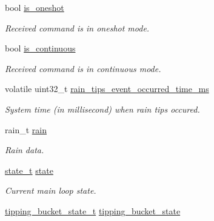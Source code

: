\begin{DoxyCompactItemize}
\mbox{\label{i2c-rain_8h_a6090a983e62d9556906716dd85f78d9d}} 
bool \hyperlink{i2c-rain_8h_a6090a983e62d9556906716dd85f78d9d}{is\+\_\+oneshot}
\begin{DoxyCompactList}\small\item\em Received command is in oneshot mode. \end{DoxyCompactList}\item 
\mbox{\label{i2c-rain_8h_a75ef189b6b17aa09010c574ed6b01fc3}} 
bool \hyperlink{i2c-rain_8h_a75ef189b6b17aa09010c574ed6b01fc3}{is\+\_\+continuous}
\begin{DoxyCompactList}\small\item\em Received command is in continuous mode. \end{DoxyCompactList}\item 
\mbox{\label{i2c-rain_8h_aa0097a28d3e4da7c88e72228e9b236d2}} 
volatile uint32\+\_\+t \hyperlink{i2c-rain_8h_aa0097a28d3e4da7c88e72228e9b236d2}{rain\+\_\+tips\+\_\+event\+\_\+occurred\+\_\+time\+\_\+ms}
\begin{DoxyCompactList}\small\item\em System time (in millisecond) when rain tips occured. \end{DoxyCompactList}\item 
\mbox{\label{i2c-rain_8h_a5688d7d07e5d53ec6ccd7acce49a728c}} 
rain\+\_\+t \hyperlink{i2c-rain_8h_a5688d7d07e5d53ec6ccd7acce49a728c}{rain}
\begin{DoxyCompactList}\small\item\em Rain data. \end{DoxyCompactList}\item 
\mbox{\label{i2c-rain_8h_adc6e5733fc3c22f0a7b2914188c49c90}} 
\hyperlink{i2c-rain_8h_aa0aafed44fec19806d8f9ad834be1248}{state\+\_\+t} \hyperlink{i2c-rain_8h_adc6e5733fc3c22f0a7b2914188c49c90}{state}
\begin{DoxyCompactList}\small\item\em Current main loop state. \end{DoxyCompactList}\item 
\mbox{\label{i2c-rain_8h_ad17df11ab3931697018251d1e0e49d4a}} 
\hyperlink{i2c-rain_8h_a7935f2f599e6a870190d4ae0a86205ba}{tipping\+\_\+bucket\+\_\+state\+\_\+t} \hyperlink{i2c-rain_8h_ad17df11ab3931697018251d1e0e49d4a}{tipping\+\_\+bucket\+\_\+state}

\end{DoxyCompactItemize}
